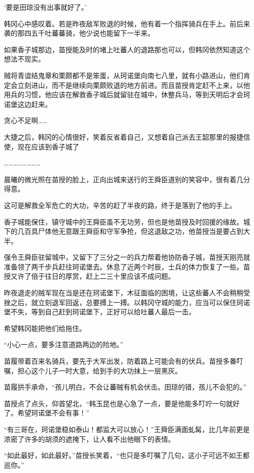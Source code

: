 ‘要是田琼没有出事就好了。’

韩冈心中感叹着。若是昨夜敌军败退的时候，他有着一个指挥骑兵在手上。前后来袭的那四五千吐蕃蕃骑，他少说也能留下一半来。

如果香子城那边，苗授能及时的堵上吐蕃人的退路那也可以，但韩冈依然知道这个想法不现实。

贼将青谊结鬼章和栗颇都不是笨蛋，从珂诺堡向南七八里，就有小路进山，他们肯定会立刻进山，而不是继续向栗颇败退的地方前进。而且苗授肯定赶不上来，以他用兵的习惯，他应该在解救香子城后就留驻在城中，休整兵马，等到天明后才会珂诺堡这边赶来。

贪心不足啊……

大捷之后，韩冈的心情很好，笑着反省着自己，又想着自己派去王韶那里的报捷信使，现在应该到香子城了

……………………

晨曦的微光照在苗授的脸上，正向出城来送行的王舜臣道别的笑容中，很有着几分得意。

这可是解救全军危亡的大功，辛苦的赶了半夜的路，终于是落到了他的手上。

香子城能保住，镇守城中的王舜臣虽不无功劳，但也是他苗授及时回援的缘故。城下的几百具尸体他无意跟王舜臣和守军争抢，但这退敌之功，他苗授当是要占到大半。

强令王舜臣驻留城中，又留下了三分之一的兵力帮着他协防香子城，苗授天刚亮就准备领了两千步兵赶往珂诺堡去。休息了近两个时辰，士兵的体力恢复了一些。苗授又许了倍于往日的厚赏，赶上二三十里应该不成问题。

昨夜退走的贼军现在当是还在珂诺堡下，木征面临的困境，让这些蕃人不会稍稍受挫之后，就立刻退军回返，总要搏上一搏。以韩冈守城的能力，应当可以保住珂诺堡不失，等到自己赶到珂诺堡下，正好可以给吐蕃人最后一击。

希望韩冈能把他们给拖住。

“小心一点，要多注意道路两边的险地。”

苗履带着百来名骑兵，要先于大军出发，防着路上可能会有的伏兵。苗授多番叮嘱，担心这个儿子一时大意，给到手的大功抹上一层黑灰。

苗履拱手承命，“孩儿明白，不会让蕃贼有机会伏击。田琼的错，孩儿不会犯的。”

苗授点了点头，仰首望北，“韩玉昆也是心急了一点，要是他能多叮咛一句就好了。希望珂诺堡不会有事！”

“有三哥在，珂诺堡稳如泰山！都监大可以放心！”王舜臣满面虬髯，比几年前更是浓密了许多的胡须的遮掩下，让人看不出他眼下的表情。

“如此最好，如此最好。”苗授长笑着，“也只是多叮嘱了几句，这小子可远不如王都巡你。”


